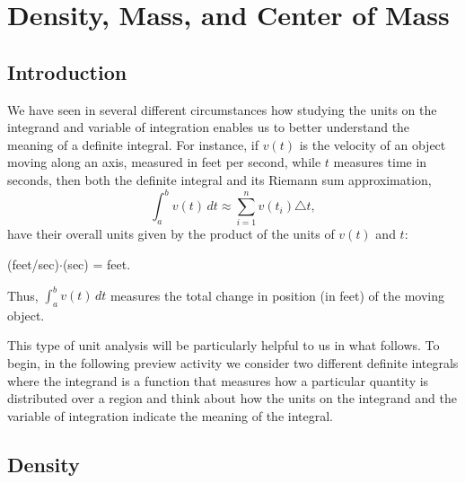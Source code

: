 \section{Density, Mass, and Center of Mass} \label{S:6.3.Mass}

\vspace*{-14 pt}

\subsection*{Introduction}

We have seen in several different circumstances how studying the units on the integrand and variable of integration enables us to better understand the meaning of a definite integral.  For instance, if $v(t)$ is the velocity of an object moving along an axis, measured in feet per second, while $t$ measures time in seconds, then both the definite integral and its Riemann sum approximation,
$$\int_a^b v(t) \, dt \approx \sum_{i=1}^n v(t_i) \triangle t,$$
have their overall units given by the product of the units of $v(t)$ and $t$: 
\begin{center}(feet/sec)$\cdot$(sec) = feet.
\end{center}
Thus, $\int_a^b v(t) \, dt$ measures the total change in position (in feet) of the moving object.  

This type of unit analysis will be particularly helpful to us in what follows.  To begin, in the following preview activity we consider two different definite integrals where the integrand is a function that measures how a particular quantity is distributed over a region and think about how the units on the integrand and the variable of integration indicate the meaning of the integral.



\subsection*{Density} 

